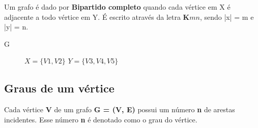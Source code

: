 \documentclass[a4paper, 12pt]{article}
\begin{document}
Um grafo é dado por \textbf{Bipartido completo} quando cada vértice em X é adjacente a todo vértice em Y. É escrito através da letra $\textbf{K}{mn}$, sendo |x| = m e |y| = n.

\begin{center}
	G\:
	\begin{figure}[hbt!]
		\centering

	\caption{$X = \{V1, V2\}$ $Y = \{V3, V4, V5\}$}
\end{figure}
\end{center}


\subsection{Graus de um vértice}

    Cada vértice \textbf{V} de um grafo \textbf{G = (V, E)} possui um número \textbf{n} de arestas incidentes. Esse número \textbf{n} é denotado como o grau do vértice.
\end{document}
